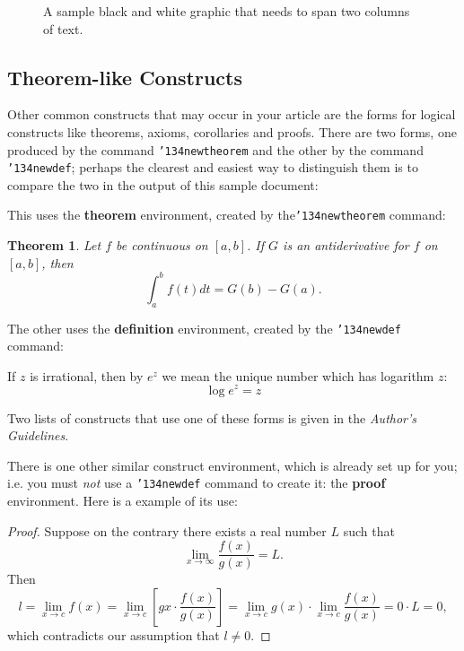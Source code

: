 \documentclass{sig-alternate-05-2015}
\begin{document}
	\begin{figure*}
		\centering
		\caption{A sample black and white graphic
			that needs to span two columns of text.}
	\end{figure*}
	
	\subsection{Theorem-like Constructs}
	Other common constructs that may occur in your article are
	the forms for logical constructs like theorems, axioms,
	corollaries and proofs.  There are
	two forms, one produced by the
	command \texttt{{\char'134}newtheorem} and the
	other by the command \texttt{{\char'134}newdef}; perhaps
	the clearest and easiest way to distinguish them is
	to compare the two in the output of this sample document:
	
	This uses the \textbf{theorem} environment, created by
	the\linebreak\texttt{{\char'134}newtheorem} command:
	\newtheorem{theorem}{Theorem}
	\begin{theorem}
		Let $f$ be continuous on $[a,b]$.  If $G$ is
		an antiderivative for $f$ on $[a,b]$, then
		\begin{displaymath}\int^b_af(t)dt = G(b) - G(a).\end{displaymath}
	\end{theorem}
	
	The other uses the \textbf{definition} environment, created
	by the \texttt{{\char'134}newdef} command:
	\begin{definition}
		If $z$ is irrational, then by $e^z$ we mean the
		unique number which has
		logarithm $z$: \begin{displaymath}{\log e^z = z}\end{displaymath}
	\end{definition}
	
	Two lists of constructs that use one of these
	forms is given in the
	\textit{Author's  Guidelines}.
	
	There is one other similar construct environment, which is
	already set up
	for you; i.e. you must \textit{not} use
	a \texttt{{\char'134}newdef} command to
	create it: the \textbf{proof} environment.  Here
	is a example of its use:
	\begin{proof}
		Suppose on the contrary there exists a real number $L$ such that
		\begin{displaymath}
		\lim_{x\rightarrow\infty} \frac{f(x)}{g(x)} = L.
		\end{displaymath}
		Then
		\begin{displaymath}
		l=\lim_{x\rightarrow c} f(x)
		= \lim_{x\rightarrow c}
		\left[ g{x} \cdot \frac{f(x)}{g(x)} \right ]
		= \lim_{x\rightarrow c} g(x) \cdot \lim_{x\rightarrow c}
		\frac{f(x)}{g(x)} = 0\cdot L = 0,
		\end{displaymath}
		which contradicts our assumption that $l\neq 0$.
	\end{proof}
	
\end{document}
